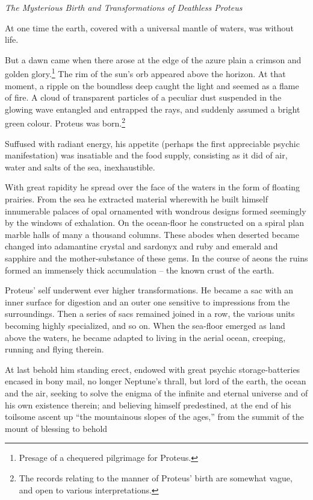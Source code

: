 \documentclass[a4paper, 12pt, oneside]{article}
\begin{document}
\emph{The Mysterious Birth and Transformations of Deathless Proteus} 

At one time the earth, covered with a universal mantle of waters, was without life.

But a dawn came when there arose at the edge of the azure plain a crimson and golden glory.\footnote{Presage of a chequered pilgrimage for Proteus.} The rim of the sun's orb appeared above the horizon. At that moment, a ripple on the boundless deep caught the light and seemed as a flame of fire. A cloud of transparent particles of a peculiar dust suspended in the glowing wave entangled and entrapped the rays, and suddenly assumed a bright green colour. Proteus was born.\footnote{The records relating to the manner of Proteus' birth are somewhat vague, and open to various interpretations.}

Suffused with radiant energy, his appetite (perhaps the first appreciable psychic manifestation) was insatiable and the food supply, consisting as it did of air, water and salts of the sea, inexhaustible.

With great rapidity he spread over the face of the waters in the form of floating prairies. From the sea he extracted material wherewith he built himself innumerable palaces of opal ornamented with wondrous designs formed seemingly by the windows of exhalation. On the ocean-floor he constructed on a spiral plan marble halls of many a thousand columns. These abodes when deserted became changed into adamantine crystal and sardonyx and ruby and emerald and sapphire and the mother-substance of these gems. In the course of aeons the ruins formed an immensely thick accumulation -- the known crust of the earth.

Proteus' self underwent ever higher transformations. He became a sac with an inner surface for digestion and an outer one sensitive to impressions from the surroundings. Then a series of sacs remained joined in a row, the various units becoming highly specialized, and so on. When the sea-floor emerged as land above the waters, he became adapted to living in the aerial ocean, creeping, running and flying therein.

At last behold him standing erect, endowed with great psychic storage-batteries encased in bony mail, no longer Neptune's thrall, but lord of the earth, the ocean and the air, seeking to solve the enigma of the infinite and eternal universe and of his own existence therein; and believing himself predestined, at the end of his toilsome ascent up ``the mountainous slopes of the ages,'' from the summit of the mount of blessing to behold
\end{document}
